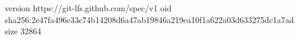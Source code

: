 version https://git-lfs.github.com/spec/v1
oid sha256:2e47fa496e33c74b14208d6a47ab19846a219ea10f1a622a03d633275dc1a7ad
size 32864
